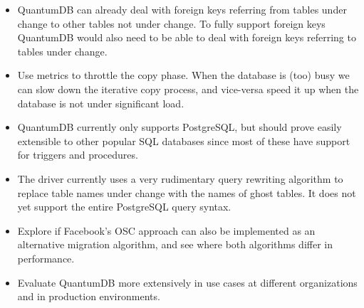 \documentclass[conference]{IEEEtran}
\begin{document}
\begin{itemize}
  \item{QuantumDB can already deal with foreign keys referring from tables under change to other tables not under change. To fully support foreign keys QuantumDB would also need to be able to deal with foreign keys referring to tables under change.}
  \item{Use metrics to throttle the copy phase. When the database is (too) busy we can slow down the iterative copy process, and vice-versa speed it up when the database is not under significant load.}
  \item{QuantumDB currently only supports PostgreSQL, but should prove easily extensible to other popular SQL databases since most of these have support for triggers and procedures.}
  \item{The driver currently uses a very rudimentary query rewriting algorithm to replace table names under change with the names of ghost tables. It does not yet support the entire PostgreSQL query syntax.}
  \item{Explore if Facebook's OSC approach can also be implemented as an alternative migration algorithm, and see where both algorithms differ in performance.}
  \item{Evaluate QuantumDB more extensively in use cases at different organizations and in production environments.}
\end{itemize}



%
%
\end{document}
